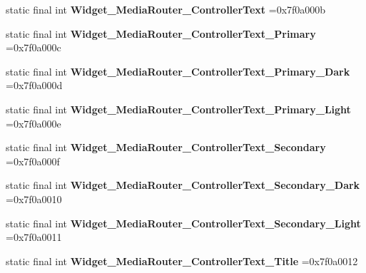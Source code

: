 \begin{DoxyCompactItemize}
\item 
\mbox{\label{classproject4_1_1xaria_1_1R_1_1style_acbca56041e6465bd217fc08795adb020}} 
static final int {\bfseries Widget\+\_\+\+Media\+Router\+\_\+\+Controller\+Text} =0x7f0a000b
\item 
\mbox{\label{classproject4_1_1xaria_1_1R_1_1style_ad0e39733d95a32f0256ad3104adf1833}} 
static final int {\bfseries Widget\+\_\+\+Media\+Router\+\_\+\+Controller\+Text\+\_\+\+Primary} =0x7f0a000c
\item 
\mbox{\label{classproject4_1_1xaria_1_1R_1_1style_ac02453488755d82e095aa7e46522c958}} 
static final int {\bfseries Widget\+\_\+\+Media\+Router\+\_\+\+Controller\+Text\+\_\+\+Primary\+\_\+\+Dark} =0x7f0a000d
\item 
\mbox{\label{classproject4_1_1xaria_1_1R_1_1style_a8f28e190467b02e582ba9c220635cc40}} 
static final int {\bfseries Widget\+\_\+\+Media\+Router\+\_\+\+Controller\+Text\+\_\+\+Primary\+\_\+\+Light} =0x7f0a000e
\item 
\mbox{\label{classproject4_1_1xaria_1_1R_1_1style_a7e377ce337c45e05af28602377784e36}} 
static final int {\bfseries Widget\+\_\+\+Media\+Router\+\_\+\+Controller\+Text\+\_\+\+Secondary} =0x7f0a000f
\item 
\mbox{\label{classproject4_1_1xaria_1_1R_1_1style_a7a91537b153a5a7712f86727b8e2f8cb}} 
static final int {\bfseries Widget\+\_\+\+Media\+Router\+\_\+\+Controller\+Text\+\_\+\+Secondary\+\_\+\+Dark} =0x7f0a0010
\item 
\mbox{\label{classproject4_1_1xaria_1_1R_1_1style_af67f71a1ce9bf68b80936e9aa10d6f6a}} 
static final int {\bfseries Widget\+\_\+\+Media\+Router\+\_\+\+Controller\+Text\+\_\+\+Secondary\+\_\+\+Light} =0x7f0a0011
\item 
\mbox{\label{classproject4_1_1xaria_1_1R_1_1style_afebbd2e9b7b7a4a35183e80d3bd6f598}} 
static final int {\bfseries Widget\+\_\+\+Media\+Router\+\_\+\+Controller\+Text\+\_\+\+Title} =0x7f0a0012

\end{DoxyCompactItemize}
